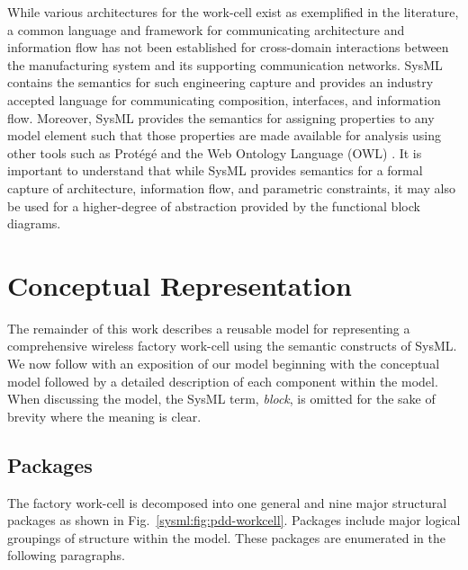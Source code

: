While various architectures for the work-cell exist as exemplified in the literature, a common language and framework for communicating architecture and information flow has not been established for cross-domain interactions between the manufacturing system and its supporting communication networks.
SysML contains the semantics for such engineering capture and provides an industry accepted language for communicating composition, interfaces, and information flow. Moreover, SysML provides the semantics for assigning properties to any model element such that those properties are made  available for analysis using other tools such as Prot\'eg\'e \cite{StanfordUniversity.Protege} and the Web Ontology Language (OWL) \cite{W3C2012.OWL}.
It is important to understand that while SysML provides semantics for a formal capture of architecture, information flow, and parametric constraints, it may also be used for a higher-degree of abstraction provided by the functional block diagrams.  

\section{Conceptual Representation} \label{sysml:sec:conceptual}
The remainder of this work describes a reusable model for representing a comprehensive wireless factory work-cell using the semantic constructs of SysML.  We now follow with an exposition of our model beginning with the conceptual model followed by a detailed description of each component within the model. When discussing the model, the SysML term, \textit{block}, is omitted for the sake of brevity where the meaning is clear. 
\subsection{Packages}
The factory work-cell is decomposed into one general and nine major structural packages as shown in Fig.~\ref{sysml:fig:pdd-workcell}.  Packages include major logical groupings of structure within the model.  These packages are enumerated in the following paragraphs.

